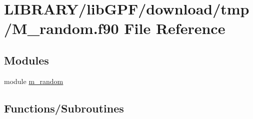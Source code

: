 \hypertarget{M__random_8f90}{}\section{L\+I\+B\+R\+A\+R\+Y/lib\+G\+P\+F/download/tmp/\+M\+\_\+random.f90 File Reference}
\label{M__random_8f90}
\subsection*{Modules}
\begin{DoxyCompactItemize}
\item 
module \hyperlink{namespacem__random}{m\+\_\+random}
\end{DoxyCompactItemize}
\subsection*{Functions/\+Subroutines}
